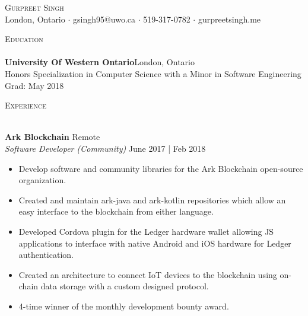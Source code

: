 \documentclass[a4paper]{article}
\newcommand{\lineunder} {
    \vspace*{-8pt} \\
    \hspace*{-18pt} \hrulefill \\
}
\newcommand{\header} [1] {
    {\hspace*{-18pt}\vspace*{6pt} \textsc{#1}}
    \vspace*{-6pt} \lineunder
}
\begin{document}
\vspace*{-40pt}

\vspace*{-10pt}
\begin{center}
	{\Huge \scshape {Gurpreet Singh}}\\
	London, Ontario $\cdot$ gsingh95@uwo.ca $\cdot$ 519-317-0782 $\cdot$ gurpreetsingh.me\\
\end{center}

\vspace*{2mm}

\header{Education}
\textbf{University Of Western Ontario}\hfill London, Ontario\\
Honors Specialization in Computer Science with a Minor in Software Engineering \hfill Grad: May 2018\\
\vspace{2mm}

\vspace*{2mm}

\header{Experience}
\vspace{1mm}

\textbf{Ark Blockchain} \hfill Remote\\
\textit{Software Developer (Community)} \hfill June 2017 | Feb 2018\\
\vspace{-1mm}
\begin{itemize} \itemsep 1pt
	\item Develop software and community libraries for the Ark Blockchain open-source organization.
	\item Created and maintain ark-java and ark-kotlin repositories which allow an easy interface to the blockchain from either language.
    \item Developed Cordova plugin for the Ledger hardware wallet allowing JS applications to interface with native Android and iOS hardware for Ledger authentication.
    \item Created an architecture to connect IoT devices to the blockchain using on-chain data storage with a custom designed protocol.\\
    \item 4-time winner of the monthly development bounty award.
\end{itemize}
\end{document}
